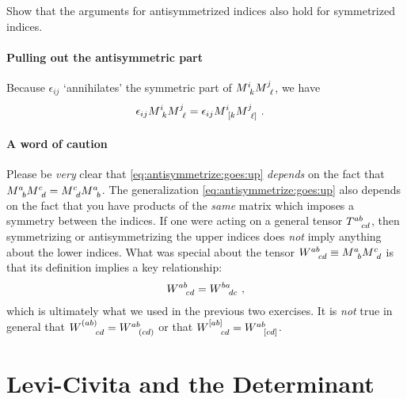 \documentclass[12pt, oneside]{report}    %
\let\oldsection\section
\def\section{%
  \setcounter{sidenote}{1}%
  \oldsection
}
\begin{document}
\begin{exercise}
Show that the arguments for antisymmetrized indices also hold for symmetrized indices.
\end{exercise}

\paragraph{Pulling out the antisymmetric part}
Because $\epsilon_{ij}$ `annihilates' the symmetric part of $M\aij{i}{k}M\aij{j}{\ell}$, we have
\begin{align}
    \epsilon_{ij}
    M\aij{i}{k}M\aij{j}{\ell}
    &=
    \epsilon_{ij}
    M\aij{i}{[k}M\aij{j}{\ell]} \ .
    \label{eq:det:invariant:int:lemma:eps:M:anti}
\end{align}

\paragraph{A word of caution}
Please be \emph{very} clear that \eqref{eq:antisymmetrize:goes:up} \emph{depends} on the fact that $M\aij{a}{b}M\aij{c}{d} = M\aij{c}{d} M\aij{a}{b}$. The generalization \eqref{eq:antisymmetrize:goes:up} also depends on the fact that you have products of the \emph{same} matrix which imposes a symmetry between the indices. If one were acting on a general tensor $T\aij{ab}{cd}$, then symmetrizing or antisymmetrizing the upper indices does \emph{not} imply anything about the lower indices. What was special about the tensor $W\aij{ab}{cd} \equiv M\aij{a}{b}M\aij{c}{d}$ is that its definition implies a key relationship:
\begin{align}
    W\aij{ab}{cd} = W\aij{ba}{dc} \ ,
\end{align}
which is ultimately what we used in the previous two exercises. It is \emph{not} true in general that $W\aij{(ab)}{cd} = W\aij{ab}{(cd)}$ or that $W\aij{[ab]}{cd} = W\aij{ab}{[cd]}$.


\section{Levi-Civita and the Determinant}
\label{sec:levi:civita:determinant}
\end{document}
